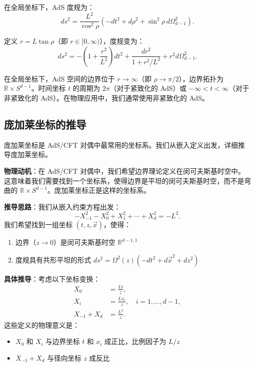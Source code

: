 在全局坐标下，AdS 度规为：
\begin{equation}
    ds^2 = \frac{L^2}{\cos^2 \rho} \left( -dt^2 + d\rho^2 + \sin^2 \rho \, d\Omega_{d-1}^2 \right).
    \label{eq:AdS_global_rho}
\end{equation}

定义 $r = L \tan \rho$（即 $r \in [0, \infty)$），度规变为：
\begin{equation}
    ds^2 = -\left(1 + \frac{r^2}{L^2}\right) dt^2 + \frac{dr^2}{1 + r^2/L^2} + r^2 d\Omega_{d-1}^2.
    \label{eq:AdS_global}
\end{equation}

\begin{remark}
在全局坐标下，AdS 空间的边界位于 $r \to \infty$（即 $\rho \to \pi/2$），边界拓扑为 $\mathbb{R} \times S^{d-1}$。时间坐标 $t$ 的周期为 $2\pi$（对于紧致化的 AdS）或 $-\infty < t < \infty$（对于非紧致化的 AdS）。在物理应用中，我们通常使用非紧致化的 AdS。
\end{remark}

\subsection{庞加莱坐标的推导}

庞加莱坐标是 AdS/CFT 对偶中最常用的坐标系。我们从嵌入定义出发，详细推导庞加莱坐标。

\textbf{物理动机}：在 AdS/CFT 对偶中，我们希望边界理论定义在闵可夫斯基时空中。这意味着我们需要找到一个坐标系，使得边界是平坦的闵可夫斯基时空，而不是弯曲的 $\mathbb{R} \times S^{d-1}$。庞加莱坐标正是这样的坐标系。

\textbf{推导思路}：我们从嵌入约束方程出发：
\begin{equation}
    -X_{-1}^2 - X_0^2 + X_1^2 + \cdots + X_d^2 = -L^2.
\end{equation}
我们希望找到一组坐标 $(t, z, \vec{x})$，使得：
\begin{enumerate}
    \item 边界（$z \to 0$）是闵可夫斯基时空 $\mathbb{R}^{d-1,1}$
    \item 度规具有共形平坦的形式 $ds^2 = \Omega^2(z)(-dt^2 + d\vec{x}^2 + dz^2)$
\end{enumerate}

\textbf{具体推导}：考虑以下坐标变换：
\begin{align}
    X_0 &= \frac{L t}{z}, \label{eq:Poincare_X0} \\
    X_i &= \frac{L x_i}{z}, \quad i = 1, \ldots, d-1, \label{eq:Poincare_Xi} \\
    X_{-1} + X_d &= \frac{L^2}{z}. \label{eq:Poincare_sum}
\end{align}
这些定义的物理意义是：
\begin{itemize}
    \item $X_0$ 和 $X_i$ 与边界坐标 $t$ 和 $x_i$ 成正比，比例因子为 $L/z$
    \item $X_{-1} + X_d$ 与径向坐标 $z$ 成反比
\end{itemize}

